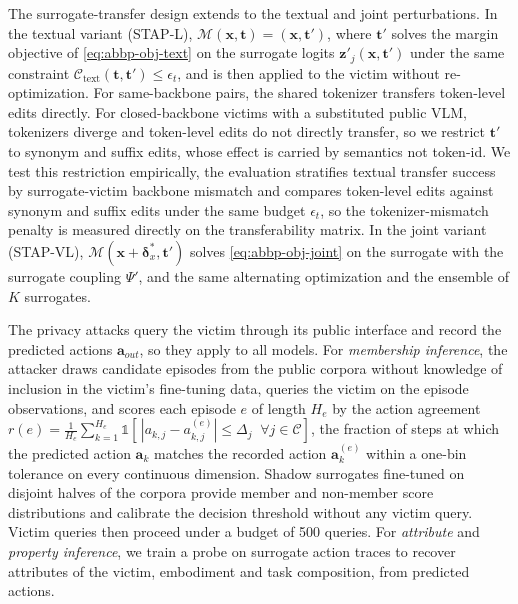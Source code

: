 \documentclass[11pt,letterpaper]{article}
\begin{document}
 The surrogate-transfer design extends to the textual and joint perturbations. %
In the textual variant (STAP-L), $\mathcal{M}(\bm{x},\bm{t})=(\bm{x},\bm{t}')$, where $\bm{t}'$ solves the margin objective of \autoref{eq:abbp-obj-text} on the surrogate logits $\bm{z}'_j(\bm{x},\bm{t}')$ under the same constraint $\mathcal{C}_{\mathrm{text}}(\bm{t},\bm{t}')\le\epsilon_t$, and is then applied to the victim without re-optimization. 
For same-backbone pairs, the shared tokenizer transfers token-level edits directly. For closed-backbone victims with a substituted public VLM, tokenizers diverge and token-level edits do not directly transfer, so we restrict $\bm{t}'$ to synonym and suffix edits, whose effect is carried by semantics not token-id. 
We test this restriction empirically, \ie the evaluation stratifies textual transfer success by surrogate-victim backbone mismatch and compares token-level edits against synonym and suffix edits under the same budget $\epsilon_t$, so the tokenizer-mismatch penalty is measured directly on the transferability matrix.
In the joint variant (STAP-VL), $\mathcal{M}(\bm{x}+\bm{\delta}_x^{*},\bm{t}')$ solves \autoref{eq:abbp-obj-joint} on the surrogate with the surrogate coupling $\Psi'$, and the same alternating optimization and the ensemble of $K$ surrogates.


 The privacy attacks query the victim through its public interface and record the predicted actions $\bm{a}_{out}$, so they apply to all models. 
For \emph{membership inference}, the attacker draws candidate episodes from the public corpora  without knowledge of inclusion in the victim's fine-tuning data, queries the victim on the episode observations, and scores each episode $e$ of length $H_e$ by the action agreement $r(e)=\frac{1}{H_e}\sum_{k=1}^{H_e}\mathbb{1}[\,|a_{k,j}-a^{(e)}_{k,j}|\le\Delta_j\;\;\forall j\in\mathcal{C}]$, \ie the fraction of steps at which the predicted action $\bm{a}_k$ matches the recorded action $\bm{a}^{(e)}_k$ within a one-bin tolerance on every continuous dimension. 
Shadow surrogates fine-tuned on disjoint halves of the corpora provide member and non-member score distributions and calibrate the decision threshold without any victim query. Victim queries then proceed under a budget of 500 queries. For \emph{attribute} and \emph{property inference}, we train a probe on surrogate action traces to recover attributes of the victim, \eg embodiment and task composition, from predicted actions.
\end{document}
